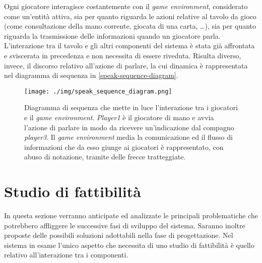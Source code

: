 \documentclass[a4paper,12pt]{article}
\begin{document}
Ogni giocatore interagisce costantemente con il \emph{game environment}, considerato come un'entità attiva, sia per quanto riguarda le azioni relative al tavolo da gioco (come consultazione della mano corrente, giocata di una carta, \dots), sia per quanto riguarda la trasmissione delle informazioni quando un giocatore parla. L'interazione tra il tavolo e gli altri componenti del sistema è stata già affrontata e sviscerata in precedenza e non necessita di essere riveduta. Risulta diverso, invece, il discorso relativo all'azione di parlare, la cui dinamica è rappresentata nel diagramma di sequenza in \autoref{speak-sequence-diagram}.

\begin{figure}[H]
	\hspace*{-0.85in}
	\centering
	\texttt{[image: ./img/speak\_sequence\_diagram.png]}
	\caption{Diagramma di sequenza che mette in luce l'interazione tra i giocatori e il \emph{game environment}. \emph{Player1} è il giocatore di mano e avvia l'azione di parlare in modo da ricevere un'indicazione dal compagno \emph{player3}. Il \emph{game environment} media la comunicazione ed il flusso di informazioni che da esso giunge ai giocatori è rappresentato, con abuso di notazione, tramite delle frecce tratteggiate. \label{speak-sequence-diagram}}
\end{figure}


\section{Studio di fattibilità} \label{feasibility-study}
In questa sezione verranno anticipate ed analizzate le principali problematiche che potrebbero affliggere le successive fasi di sviluppo del sistema. Saranno inoltre proposte delle possibili soluzioni adottabili nella fase di progettazione. Nel sistema in esame l'unico aspetto che necessita di uno studio di fattibilità è quello relativo all'interazione tra i componenti.
\end{document}
